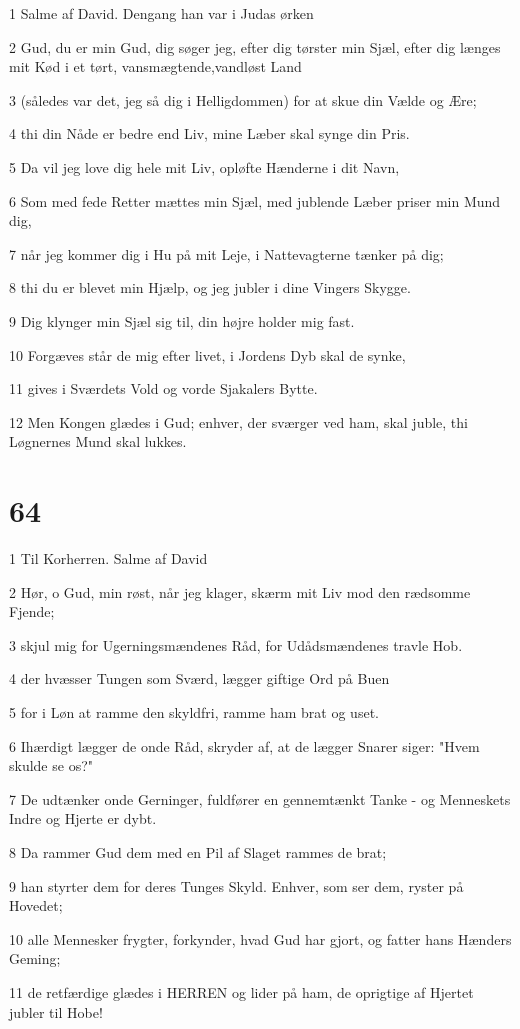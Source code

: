 \par 1 Salme af David. Dengang han var i Judas ørken
\par 2 Gud, du er min Gud, dig søger jeg, efter dig tørster min Sjæl, efter dig længes mit Kød i et tørt, vansmægtende,vandløst Land
\par 3 (således var det, jeg så dig i Helligdommen) for at skue din Vælde og Ære;
\par 4 thi din Nåde er bedre end Liv, mine Læber skal synge din Pris.
\par 5 Da vil jeg love dig hele mit Liv, opløfte Hænderne i dit Navn,
\par 6 Som med fede Retter mættes min Sjæl, med jublende Læber priser min Mund dig,
\par 7 når jeg kommer dig i Hu på mit Leje, i Nattevagterne tænker på dig;
\par 8 thi du er blevet min Hjælp, og jeg jubler i dine Vingers Skygge.
\par 9 Dig klynger min Sjæl sig til, din højre holder mig fast.
\par 10 Forgæves står de mig efter livet, i Jordens Dyb skal de synke,
\par 11 gives i Sværdets Vold og vorde Sjakalers Bytte.
\par 12 Men Kongen glædes i Gud; enhver, der sværger ved ham, skal juble, thi Løgnernes Mund skal lukkes.

\chapter{64}

\par 1 Til Korherren. Salme af David
\par 2 Hør, o Gud, min røst, når jeg klager, skærm mit Liv mod den rædsomme Fjende;
\par 3 skjul mig for Ugerningsmændenes Råd, for Udådsmændenes travle Hob.
\par 4 der hvæsser Tungen som Sværd, lægger giftige Ord på Buen
\par 5 for i Løn at ramme den skyldfri, ramme ham brat og uset.
\par 6 Ihærdigt lægger de onde Råd, skryder af, at de lægger Snarer siger: "Hvem skulde se os?"
\par 7 De udtænker onde Gerninger, fuldfører en gennemtænkt Tanke - og Menneskets Indre og Hjerte er dybt.
\par 8 Da rammer Gud dem med en Pil af Slaget rammes de brat;
\par 9 han styrter dem for deres Tunges Skyld. Enhver, som ser dem, ryster på Hovedet;
\par 10 alle Mennesker frygter, forkynder, hvad Gud har gjort, og fatter hans Hænders Geming;
\par 11 de retfærdige glædes i HERREN og lider på ham, de oprigtige af Hjertet jubler til Hobe!


